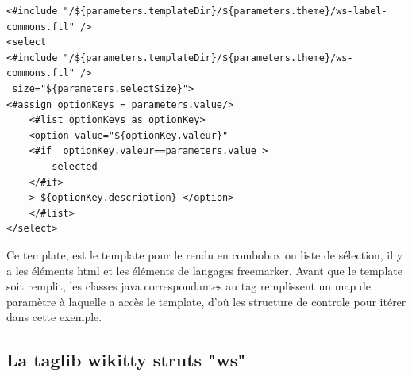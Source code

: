 


\begin{lstlisting}
<#include "/${parameters.templateDir}/${parameters.theme}/ws-label-commons.ftl" />
<select 
<#include "/${parameters.templateDir}/${parameters.theme}/ws-commons.ftl" />
 size="${parameters.selectSize}">
<#assign optionKeys = parameters.value/>
    <#list optionKeys as optionKey>
	<option value="${optionKey.valeur}"
	<#if  optionKey.valeur==parameters.value >
		selected
	</#if>
	> ${optionKey.description} </option>
	</#list>
</select>
\end{lstlisting}

Ce template, est le template pour le rendu en combobox ou liste de sélection,
il y a les éléments html et les éléments de langages freemarker. Avant que le
template soit remplit, les classes java correspondantes au tag remplissent 
un map de paramètre à laquelle a accès le template, d'où les structure de controle
pour itérer dans cette exemple. 


\subsection{La taglib wikitty struts "ws"}

